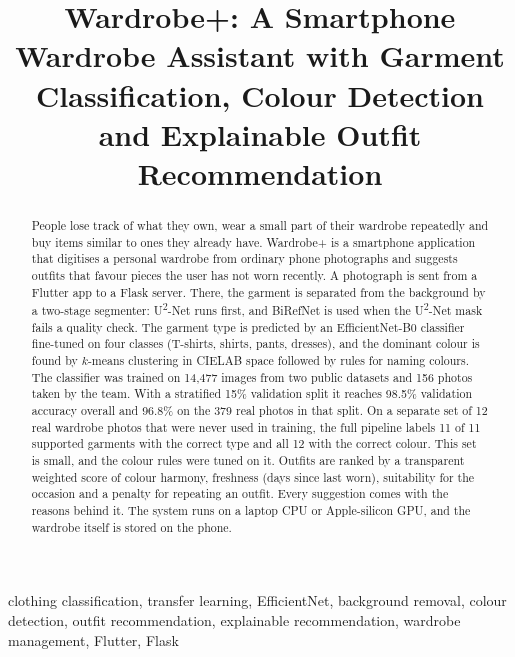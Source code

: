 \documentclass[conference]{IEEEtran}
\begin{document}
\title{Wardrobe+: A Smartphone Wardrobe Assistant with Garment Classification, Colour Detection and Explainable Outfit Recommendation}

\author{
}

\maketitle

\begin{abstract}
People lose track of what they own, wear a small part of their wardrobe repeatedly and buy items similar to ones they already have. Wardrobe+ is a smartphone application that digitises a personal wardrobe from ordinary phone photographs and suggests outfits that favour pieces the user has not worn recently. A photograph is sent from a Flutter app to a Flask server. There, the garment is separated from the background by a two-stage segmenter: U\textsuperscript{2}-Net runs first, and BiRefNet is used when the U\textsuperscript{2}-Net mask fails a quality check. The garment type is predicted by an EfficientNet-B0 classifier fine-tuned on four classes (T-shirts, shirts, pants, dresses), and the dominant colour is found by $k$-means clustering in CIELAB space followed by rules for naming colours. The classifier was trained on 14{,}477 images from two public datasets and 156 photos taken by the team. With a stratified 15\% validation split it reaches 98.5\% validation accuracy overall and 96.8\% on the 379 real photos in that split. On a separate set of 12 real wardrobe photos that were never used in training, the full pipeline labels 11 of 11 supported garments with the correct type and all 12 with the correct colour. This set is small, and the colour rules were tuned on it. Outfits are ranked by a transparent weighted score of colour harmony, freshness (days since last worn), suitability for the occasion and a penalty for repeating an outfit. Every suggestion comes with the reasons behind it. The system runs on a laptop CPU or Apple-silicon GPU, and the wardrobe itself is stored on the phone.
\end{abstract}

\begin{IEEEkeywords}
clothing classification, transfer learning, EfficientNet, background removal, colour detection, outfit recommendation, explainable recommendation, wardrobe management, Flutter, Flask
\end{IEEEkeywords}
\end{document}
